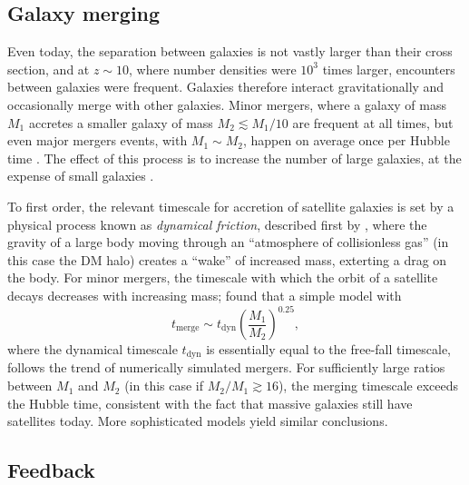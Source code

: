 \documentclass[useAMS,usenatbib,bibyear]{aa}
\begin{document}
\subsection{Galaxy merging}
\label{sec:merging}

Even today, the separation between galaxies is not vastly larger than their cross section, and at $z\sim10$, where number densities were $10^3$ times larger, encounters between galaxies were frequent. Galaxies therefore interact gravitationally and occasionally merge with other galaxies. Minor mergers, where a galaxy of mass $M_1$ accretes a smaller galaxy of mass $M_2 \lesssim M_1/10$ are frequent at all times, but even major mergers events, with $M_1\sim M_2$, happen on average once per Hubble time \citep{Lacey1993}.
The effect of this process is to increase the number of large galaxies, at the expense of small galaxies \citep[e.g.][]{Cole1991,Kauffmann1993}.

To first order, the relevant timescale for accretion of satellite galaxies is set by a physical process known as \emph{dynamical friction}, described first by \citet{Chandrasekhar1943}, where the gravity of a large body moving through an ``atmosphere of collisionless gas'' (in this case the DM halo) creates a ``wake'' of increased mass, exterting a drag on the body.
For minor mergers, the timescale with which the orbit of a satellite decays decreases with increasing mass; \citet{Cole1994} found that a simple model with
\begin{equation}
    \label{eq:tmerge}
    t_\mathrm{merge} \sim t_\mathrm{dyn} \left( \frac{M_1}{M_2} \right)^{0.25},
\end{equation}
where the dynamical timescale $t_\mathrm{dyn}$ is essentially equal to the free-fall timescale, follows the trend of numerically simulated mergers.
For sufficiently large ratios between $M_1$ and $M_2$ (in this case if $M_2/M_1\gtrsim16$), the merging timescale exceeds the Hubble time, consistent with the fact that massive galaxies still have satellites today.
More sophisticated models \citep[e.g][]{Boylan-Kolchin2008}
yield similar conclusions.

\subsection{Feedback}
\label{sec:feedback}
\end{document}
